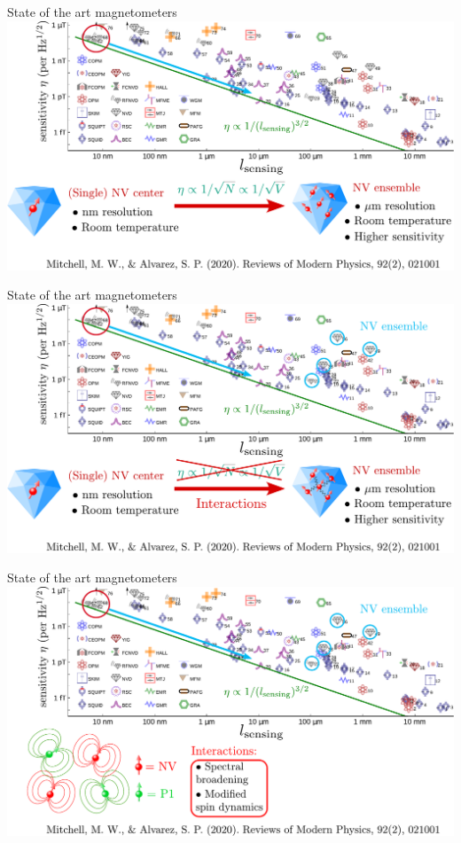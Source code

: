 \documentclass{beamer}
\begin{document}
\begin{frame}{State of the art magnetometers}
\centering
\includegraphics[width=\textwidth,height=0.85\textheight,keepaspectratio]{Slide_quantum_magnetometers_NV_n-1}
\end{frame}

\begin{frame}{State of the art magnetometers}
\centering
\includegraphics[width=\textwidth,height=0.85\textheight,keepaspectratio]{Slide_quantum_magnetometers_NV_n}
\end{frame}

\begin{frame}{State of the art magnetometers}
\centering
\includegraphics[width=\textwidth,height=0.85\textheight,keepaspectratio]{Slide_quantum_magnetometers_NV_n+1}
\end{frame}
\end{document}
